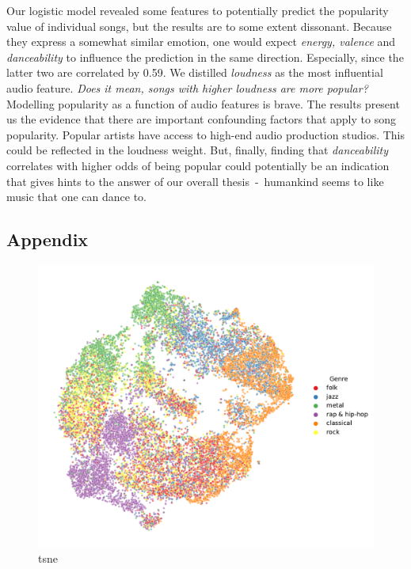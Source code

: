\documentclass{article}
\begin{document}
Our logistic model revealed some features to potentially predict the popularity value of individual songs, but the results are to some extent dissonant. Because they express a somewhat similar emotion, one would expect \emph{energy, valence} and \emph{danceability} to influence the prediction in the same direction. Especially, since the latter two are correlated by \num{0.59}.
We distilled \emph{loudness} as the most influential audio feature. 
\emph{Does it mean, songs with higher loudness are more popular?} Modelling popularity as a function of audio features is brave. The results present us the evidence that there are important confounding factors that apply to song popularity. 
Popular artists have access to high-end audio production studios. This could be reflected in the loudness weight.
But, finally, finding that \textit{danceability} correlates with higher odds of being popular could potentially be an indication that gives hints to the answer of our overall thesis~-~humankind seems to like music that one can dance to.




\begin{appendix}
\section{Appendix}

\newpage

\begin{figure}
  \centering
  \includegraphics[width=1.0\textwidth]{../figures/tsne_genres.pdf}
  \caption{tsne}
  \label{fig:tsne_genres}
\end{figure}

\end{appendix}
\end{document}
